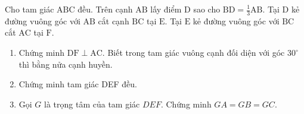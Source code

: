 \begin{bt}
	Cho tam giác $\mathrm{ABC}$ đều. Trên cạnh $\mathrm{AB}$ lấy điểm $\mathrm{D}$ sao cho $\mathrm{BD}=\frac{1}{3} \mathrm{AB}$. Tại $\mathrm{D}$ kẻ đường vuông góc với $\mathrm{AB}$ cắt cạnh $\mathrm{BC}$ tại $\mathrm{E}$. Tại $\mathrm{E}$ kẻ đường vuông góc với $\mathrm{BC}$ cắt $\mathrm{AC}$ tại $\mathrm{F}$.
	\begin{enumerate}[1.]
		\item Chứng minh $\mathrm{DF} \perp \mathrm{AC}$. Biết trong tam giác vuông cạnh đối diện với góc $30^{\circ}$ thì bằng nửa cạnh huyền.
		\item Chứng minh tam giác DEF đều.
		\item Gọi $G$ là trọng tâm của tam giác $D E F$. Chứng minh $G A=G B=G C$.
	\end{enumerate}
\end{bt}
